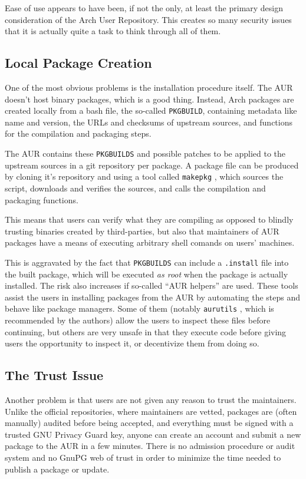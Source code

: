 Ease of use appears to have been, if not the only, at least the primary design consideration of the Arch User Repository. This creates so many security issues that it is actually quite a task to think through all of them.

\subsection*{Local Package Creation}
One of the most obvious problems is the installation procedure itself.
The AUR doesn't host binary packages, which is a good thing. Instead, Arch packages are created locally from a bash file, the so-called \texttt{PKGBUILD}, containing metadata like name and version, the URLs and checksums of upstream sources, and functions for the compilation and packaging steps.

The AUR contains these \texttt{PKGBUILDS} and possible patches to be applied to the upstream sources in a git repository per package.
A package file can be produced by cloning it's repository and using a tool called \texttt{makepkg} \cite{wiki:PackageCreation}, which sources the script, downloads and verifies the sources, and calls the compilation and packaging functions.

This means that users can verify what they are compiling as opposed to blindly trusting binaries created by third-parties, but also that maintainers of AUR packages have a means of executing arbitrary shell comands on users' machines.

This is aggravated by the fact that \texttt{PKGBUILDS} can include a \texttt{.install} file into the built package, which will be executed \emph{as root} when the package is actually installed.
The risk also increases if so-called \enquote{AUR helpers} are used. These tools assist the users in installing packages from the AUR by automating the steps and behave like package managers.
Some of them (notably \texttt{aurutils} \cite{gh:aurutils}, which is recommended by the authors) allow the users to inspect these files before continuing, but others are very unsafe in that they execute code before giving users the opportunity to inspect it, or decentivize them from doing so.

\subsection*{The Trust Issue}
Another problem is that users are not given any reason to trust the maintainers.
Unlike the official repositories, where maintainers are vetted, packages are (often manually) audited before being accepted, and everything must be signed with a trusted GNU Privacy Guard key, anyone can create an account and submit a new package to the AUR in a few minutes.
There is no admission procedure or audit system and no GnuPG web of trust in order to minimize the time needed to publish a package or update.


